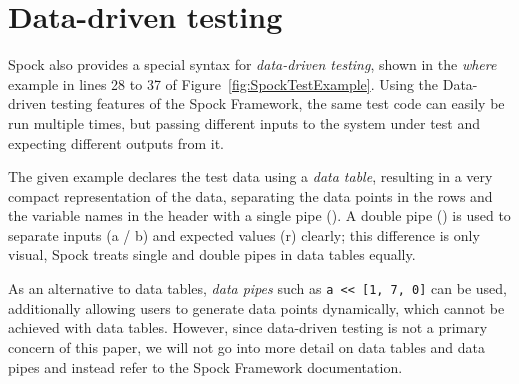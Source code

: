 \section{Data-driven testing}
Spock also provides a special syntax for \textit{data-driven testing},
shown in the \textit{where} example
in lines 28 to 37 of Figure~\ref{fig:SpockTestExample}.
Using the Data-driven testing features of the Spock Framework,
the same test code can easily be run multiple times,
but passing different inputs to the system under test
and expecting different outputs from it.
\autocite[Chapter: Data Driven Testing]{SpockFrameworkDoc}

The given example declares the test data using a \textit{data table},
resulting in a very compact representation of the data,
separating the data points in the rows
and the variable names in the header
with a single pipe (\code{|}).
A double pipe (\code{||}) is used to separate
inputs (a / b) and expected values (r) clearly;
this difference is only visual,
Spock treats single and double pipes in data tables equally.
\autocite[Chapter: Data Driven Testing - Syntactic Variations]{SpockFrameworkDoc}

As an alternative to data tables,
\textit{data pipes} such as \texttt{a << [1, 7, 0]}
can be used, additionally allowing users
to generate data points dynamically,
which cannot be achieved with data tables.
However, since data-driven testing is not a primary concern of this paper,
we will not go into more detail on data tables and data pipes
and instead refer to the Spock Framework documentation.
\autocite{SpockFrameworkDoc}
